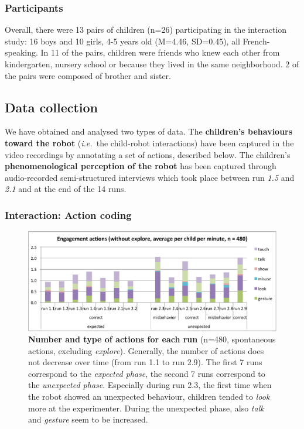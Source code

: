 \documentclass{sig-alternate}
\newcommand{\ie}{{\textit{i.e.~}}}
\begin{document}
\subsubsection{Participants}

Overall, there were 13 pairs of children (n=26) participating in the interaction
study: 16 boys and 10 girls, 4-5 years old (M=4.46, SD=0.45), all
French-speaking. In 11 of the pairs, children were friends who knew each other
from kindergarten, nursery school or because they lived in the same
neighborhood. 2 of the pairs were composed of brother and sister.



\subsection{Data collection}


We have obtained and analysed two types of data. The \textbf{children's
behaviours toward the robot} (\ie the child-robot interactions) have been
captured in the video recordings by annotating a set of actions, described
below. The children's \textbf{phenomenological perception of the robot} has been
captured through audio-recorded semi-structured interviews which took place
between run \emph{1.5} and \emph{2.1} and at the end of the 14 runs.


\subsubsection{Interaction: Action coding}

\begin{figure}[ht!] 
    \centering 
    \includegraphics[width=0.9\linewidth]{domino-time-active.pdf} 
    \caption{\small \textbf{Number and type of actions for each run} (n=480,
        spontaneous actions, excluding \emph{explore}). Generally, the number of
        actions does not decrease over time (from run 1.1 to run 2.9).  The
        first 7 runs correspond to the \textit{expected phase}, the second 7
        runs correspond to the \textit{unexpected phase}. Especially during run
        2.3, the first time when the robot showed an unexpected behaviour,
        children tended to \textit{look} more at the experimenter. During the
        unexpected phase, also \textit{talk} and \textit{gesture} seem to be
        increased.}

    \label{fig:domino-time-active} 
\end{figure}
\end{document}

